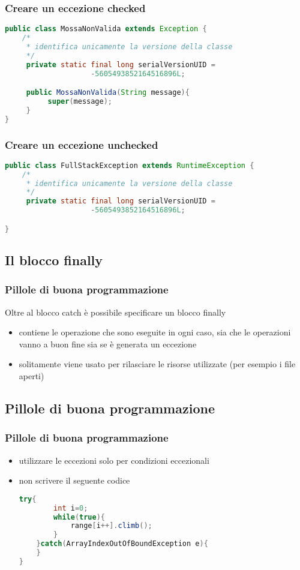 \documentclass{beamer}
\begin{document}
\begin{frame}[fragile]
\frametitle{Creare un eccezione checked}
\begin{lstlisting}[language=Java]
public class MossaNonValida extends Exception {
    /*
     * identifica unicamente la versione della classe 
     */
     private static final long serialVersionUID = 
	                -5605493852164516896L;

     public MossaNonValida(String message){
          super(message);
     }
}
\end{lstlisting}
\end{frame}



\begin{frame}[fragile]
\frametitle{Creare un eccezione unchecked}
\begin{lstlisting}[language=Java]
public class FullStackException extends RuntimeException {
    /*
     * identifica unicamente la versione della classe 
     */
     private static final long serialVersionUID = 
	                -5605493852164516896L;

}
\end{lstlisting}
\end{frame}

\subsection{Il blocco finally}
\begin{frame}[fragile]
\frametitle{Pillole di buona programmazione}
Oltre al blocco catch \`e possibile specificare un blocco finally
\begin{itemize}
\item contiene le operazione che sono eseguite in ogni caso, sia che le operazioni vanno a buon fine sia se \`e generata un eccezione
\item solitamente viene usato per rilasciare le risorse utilizzate (per esempio i file aperti)
 \end{itemize}
\end{frame}

\subsection{Pillole di buona programmazione}
\begin{frame}[fragile]
\frametitle{Pillole di buona programmazione}
\begin{itemize}
\item utilizzare le eccezioni solo per condizioni eccezionali
\item non scrivere il seguente codice
\begin{lstlisting}[language=Java]
try{
        int i=0;
        while(true){
            range[i++].climb();
        }
    }catch(ArrayIndexOutOfBoundException e){
    }
}
\end{lstlisting}
\end{itemize}
\end{frame}
\end{document}
